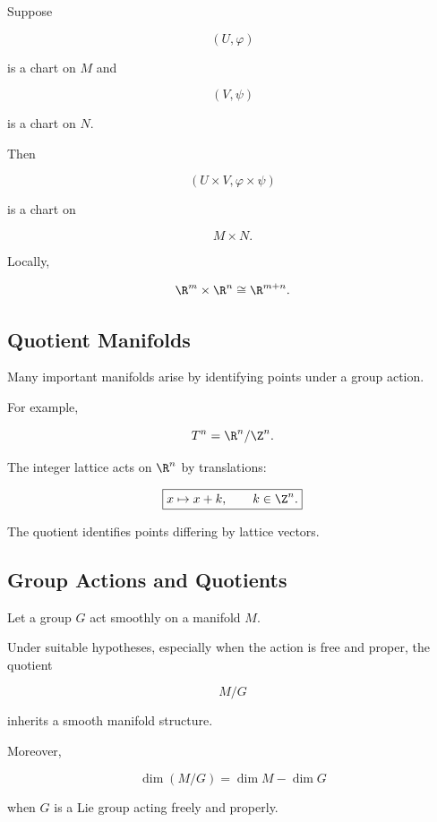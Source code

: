Suppose

\[
(U,\varphi)
\]

is a chart on \(M\) and

\[
(V,\psi)
\]

is a chart on \(N\).

Then

\[
\boxed{
(U\times V,\varphi\times\psi)
}
\]

is a chart on

\[
M\times N.
\]

Locally,

\[
\R^m\times\R^n
\cong
\R^{m+n}.
\]

\subsection{Quotient Manifolds}
\label{subsec:quotient-manifolds}

Many important manifolds arise by identifying points under a group action.

For example,

\[
T^n
=
\R^n/\Z^n.
\]

The integer lattice acts on \(\R^n\) by translations:

\[
\boxed{
x\mapsto x+k,
\qquad
k\in\Z^n.
}
\]

The quotient identifies points differing by lattice vectors.

\subsection{Group Actions and Quotients}
\label{subsec:group-actions-quotient-manifolds}

Let a group \(G\) act smoothly on a manifold \(M\).

Under suitable hypotheses, especially when the action is free and proper,
the quotient

\[
\boxed{
M/G
}
\]

inherits a smooth manifold structure.

Moreover,

\[
\boxed{
\dim(M/G)
=
\dim M-\dim G
}
\]

when \(G\) is a Lie group acting freely and properly.


